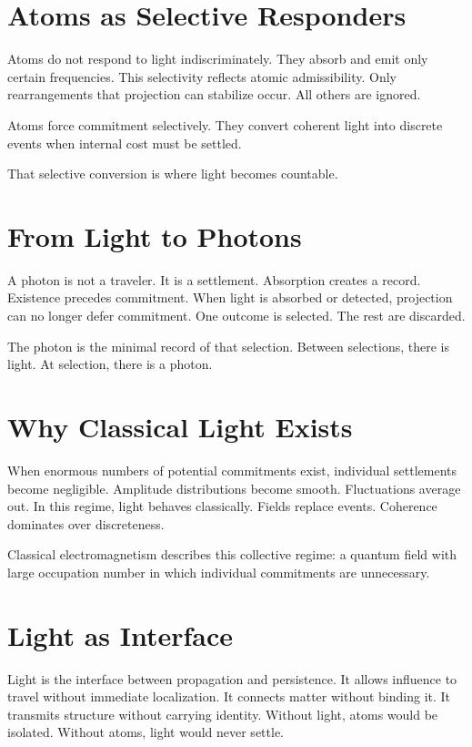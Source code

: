 \documentclass[11pt,twoside,openright]{book}
\begin{document}
\section*{Atoms as Selective Responders}

Atoms do not respond to light indiscriminately. They absorb and emit only certain frequencies. This selectivity reflects atomic admissibility. Only rearrangements that projection can stabilize occur. All others are ignored.

Atoms force commitment selectively. They convert coherent light into discrete events when internal cost must be settled.

That selective conversion is where light becomes countable.

\section*{From Light to Photons}

A photon is not a traveler. It is a settlement. Absorption creates a record. Existence precedes commitment. When light is absorbed or detected, projection can no longer defer commitment. One outcome is selected. The rest are discarded.

The photon is the minimal record of that selection. Between selections, there is light. At selection, there is a photon.

\section*{Why Classical Light Exists}

When enormous numbers of potential commitments exist, individual settlements become negligible. Amplitude distributions become smooth. Fluctuations average out. In this regime, light behaves classically. Fields replace events. Coherence dominates over discreteness.

Classical electromagnetism describes this collective regime: a quantum field with large occupation number in which individual commitments are unnecessary.

\section*{Light as Interface}

Light is the interface between propagation and persistence. It allows influence to travel without immediate localization. It connects matter without binding it. It transmits structure without carrying identity. Without light, atoms would be isolated. Without atoms, light would never settle.
\end{document}
